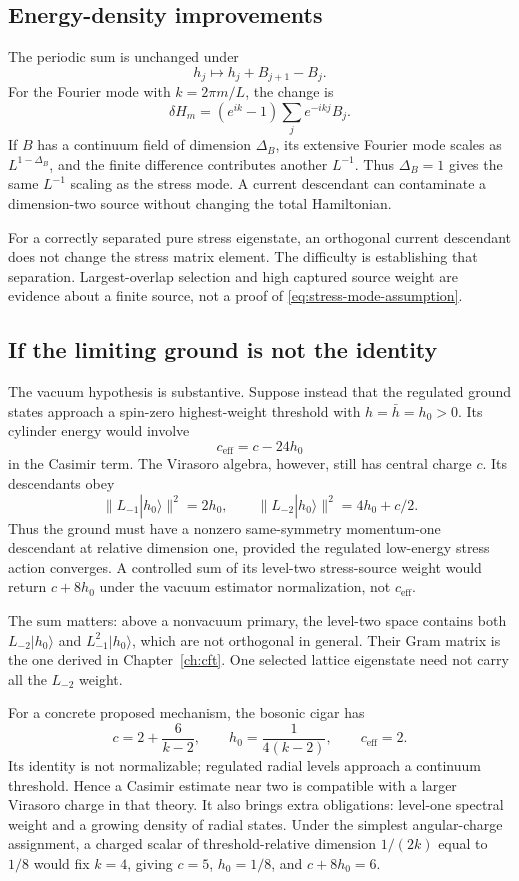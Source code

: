 \subsection{Energy-density improvements}

The periodic sum is unchanged under
\[
 h_j\mapsto h_j+B_{j+1}-B_j.
\]
For the Fourier mode with $k=2\pi m/L$, the change is
\[
 \delta H_m=(e^{ik}-1)\sum_j e^{-ikj}B_j.
\]
If $B$ has a continuum field of dimension $\Delta_B$, its extensive
Fourier mode scales as $L^{1-\Delta_B}$, and the finite difference
contributes another $L^{-1}$. Thus $\Delta_B=1$ gives the same $L^{-1}$
scaling as the stress mode. A current descendant can contaminate a
dimension-two source without changing the total Hamiltonian.

For a correctly separated pure stress eigenstate, an orthogonal current
descendant does not change the stress matrix element. The difficulty is
establishing that separation. Largest-overlap selection and high captured
source weight are evidence about a finite source, not a proof of
\eqref{eq:stress-mode-assumption}.

\subsection{If the limiting ground is not the identity}

The vacuum hypothesis is substantive. Suppose instead that the
regulated ground states approach a spin-zero highest-weight
threshold with $h=\bar h=h_0>0$. Its cylinder energy would involve
\[
 c_{\mathrm{eff}}=c-24h_0
\]
in the Casimir term. The Virasoro algebra, however, still has
central charge $c$. Its descendants obey
\[
 \|L_{-1}|h_0\rangle\|^2=2h_0,\qquad
 \|L_{-2}|h_0\rangle\|^2=4h_0+c/2.
\]
Thus the ground must have a nonzero same-symmetry momentum-one
descendant at relative dimension one, provided the regulated
low-energy stress action converges. A controlled sum of its
level-two stress-source weight would return $c+8h_0$ under the
vacuum estimator normalization, not $c_{\mathrm{eff}}$.

The sum matters: above a nonvacuum primary, the level-two space
contains both $L_{-2}|h_0\rangle$ and $L_{-1}^2|h_0\rangle$,
which are not orthogonal in general. Their Gram matrix is the one
derived in Chapter~\ref{ch:cft}. One selected lattice eigenstate
need not carry all the $L_{-2}$ weight.

For a concrete proposed mechanism, the bosonic cigar has
\[
 c=2+\frac6{k-2},\qquad h_0=\frac1{4(k-2)},\qquad
 c_{\mathrm{eff}}=2.
\]
Its identity is not normalizable; regulated radial levels approach
a continuum threshold. Hence a Casimir estimate near two is
compatible with a larger Virasoro charge in that theory. It also
brings extra obligations: level-one spectral weight and a growing
density of radial states. Under the simplest angular-charge
assignment, a charged scalar of threshold-relative dimension
$1/(2k)$ equal to $1/8$ would fix $k=4$, giving
$c=5$, $h_0=1/8$, and $c+8h_0=6$.

